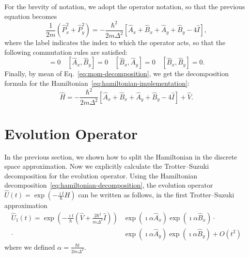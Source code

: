 For the brevity of notation, we adopt the operator notation, so that the previous equation becomes
\begin{equation} \label{eq:mom-decomposition}
\frac{1}{2m} \left( \hat{P}_x^2 + \hat{P}_y^2 \right)= -\frac{\hbar^2}{2m\Delta^2} \left[ \hat{A}_x + \hat{B}_x + \hat{A}_y + \hat{B}_y - 4 \hat{I} \right],
\end{equation}
where the label indicates the index to which the operator acts, so that the following commutation rules are satisfied:
\begin{equation}
[\hat{A}_x, \hat{A}_y] = 0 \quad [\hat{A}_x, \hat{B}_y] = 0 \quad [\hat{B}_x, \hat{A}_y] = 0 \quad [\hat{B}_x, \hat{B}_y] = 0.
\end{equation} 
Finally, by mean of Eq.~\eqref{eq:mom-decomposition}, we get the decomposition formula for the Hamiltonian~\eqref{eq:hamiltonian-implementation}:
\begin{equation} \label{eq:hamiltonian-decomposition}
\hat{H} = -\frac{\hbar^2}{2 m \Delta^2} \left[ \hat{A}_x + \hat{B}_x + \hat{A}_y + \hat{B}_y - 4 \hat{I} \right] + \hat{V}.
\end{equation}

\section{Evolution Operator}
In the previous section, we shown how to split the Hamiltonian in the discrete space approximation. Now we explicitly calculate the Trotter--Suzuki decomposition for the evolution operator. Using the Hamiltonian decomposition~\eqref{eq:hamiltonian-decomposition}, the evolution operator $\hat{U}(t) = \exp(-\frac{\imath t}{\hbar} H)$ can be written as follows, in the first Trotter--Suzuki approximation
\begin{align} \label{eq:1approxTS}
\hat{U}_1(t) = \exp\left(-\frac{\imath t}{\hbar}\left(\hat{V} + \frac{2 \hbar^2}{m \Delta^2} \hat{I}\right) \right) & \exp\left(\imath \alpha \hat{A}_x \right) \exp\left(\imath \alpha \hat{B}_x \right) \cdot \\ \cdot & \exp\left(\imath \alpha \hat{A}_y \right) \exp\left(\imath \alpha \hat{B}_y \right) + O(t^2) \nonumber
\end{align}
where we defined $\alpha = \frac{\hbar t}{2m\Delta^2}$. 

